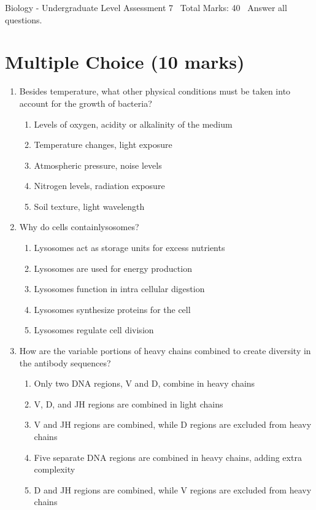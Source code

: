 \documentclass[12pt]{article}
\begin{document}
\begin{center}
Biology - Undergraduate Level Assessment 7 \
Total Marks: 40 \
Answer all questions.
\end{center}

\section*{Multiple Choice (10 marks)}
\begin{enumerate}[label=\arabic*.]
\item Besides temperature, what other physical conditions must be taken into account for the growth of bacteria?
\begin{enumerate}[label=(\alph*)]
    \item Levels of oxygen, acidity or alkalinity of the medium
    \item Temperature changes, light exposure
    \item Atmospheric pressure, noise levels
    \item Nitrogen levels, radiation exposure
    \item Soil texture, light wavelength
\end{enumerate}
\item Why do cells containlysosomes?
\begin{enumerate}[label=(\alph*)]
    \item Lysosomes act as storage units for excess nutrients
    \item Lysosomes are used for energy production
    \item Lysosomes function in intra cellular digestion
    \item Lysosomes synthesize proteins for the cell
    \item Lysosomes regulate cell division
\end{enumerate}
\item How are the variable portions of heavy chains combined to create diversity in the antibody sequences?
\begin{enumerate}[label=(\alph*)]
    \item Only two DNA regions, V and D, combine in heavy chains
    \item V, D, and JH regions are combined in light chains
    \item V and JH regions are combined, while D regions are excluded from heavy chains
    \item Five separate DNA regions are combined in heavy chains, adding extra complexity
    \item D and JH regions are combined, while V regions are excluded from heavy chains

\end{enumerate}
\end{enumerate}
\end{document}
